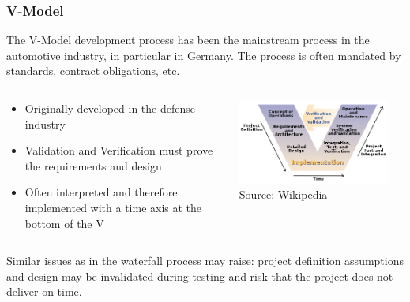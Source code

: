 \begin{frame}
\frametitle{V-Model}
The V-Model development process has been the mainstream process in the
automotive industry, in particular in Germany. The process is often mandated
by standards, contract obligations, etc.
\begin{columns}[]
    \begin{column}{0.6\textwidth}
        \begin{itemize}
            \item Originally developed in the defense industry
            \item Validation and Verification must prove the requirements and
                design
            \item Often interpreted and therefore implemented with a time
                axis at the bottom of the V
        \end{itemize}
    \end{column}
    \begin{column}{0.4\textwidth}
        \centering
        \includegraphics[width=0.9\textwidth]{images/v-model.png}\\
        \footnotesize Source: Wikipedia\footnotemark[1]
    \end{column}
\end{columns}
\begin{block}{}
Similar issues as in the waterfall process may raise: project definition
assumptions and design may be invalidated during testing and risk that the
project does not deliver on time.
\end{block}
\end{frame}

